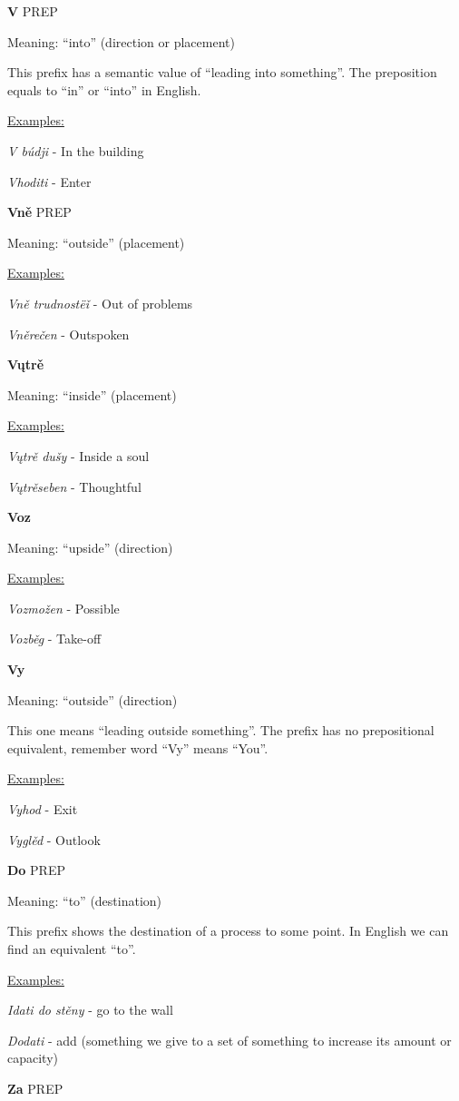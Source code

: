 \textbf{V} PREP

Meaning: “into” (direction or placement)

This prefix has a semantic value of “leading into something”. The preposition equals to “in” or “into” in English.

\underline{Examples:}

\textit{V búdji }- In the building

\textit{Vhoditi} - Enter

\textbf{Vně} PREP

Meaning: “outside” (placement)

\underline{Examples:}

\textit{Vně trudnostëǐ} - Out of problems

\textit{Vněrečen} - Outspoken

\textbf{Vųtrě}

Meaning: “inside” (placement)

\underline{Examples:}

\textit{Vųtrě dušy} - Inside a soul

\textit{Vųtrěseben} - Thoughtful

\textbf{Voz}

Meaning: “upside” (direction)

\underline{Examples:}

\textit{Vozmožen} - Possible

\textit{Vozběg} - Take-off

\textbf{Vy}

Meaning: “outside” (direction)

This one means “leading outside something”. The prefix has no prepositional equivalent, remember word “Vy” means “You”.

\underline{Examples:}

\textit{Vyhod} - Exit

\textit{Vyglěd} - Outlook

\textbf{Do} PREP

Meaning: “to” (destination)

This prefix shows the destination of a process to some point. In English we can find an equivalent “to”.

\underline{Examples:}

\textit{Idati do stěny }- go to the wall

\textit{Dodati} - add (something we give to a set of something to increase its amount or capacity)

\textbf{Za} PREP

